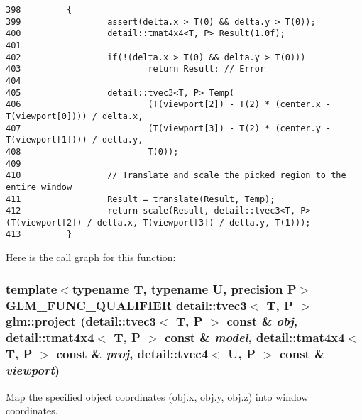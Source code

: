 \begin{Code}\begin{verbatim}398         {
399                 assert(delta.x > T(0) && delta.y > T(0));
400                 detail::tmat4x4<T, P> Result(1.0f);
401 
402                 if(!(delta.x > T(0) && delta.y > T(0)))
403                         return Result; // Error
404 
405                 detail::tvec3<T, P> Temp(
406                         (T(viewport[2]) - T(2) * (center.x - T(viewport[0]))) / delta.x,
407                         (T(viewport[3]) - T(2) * (center.y - T(viewport[1]))) / delta.y,
408                         T(0));
409 
410                 // Translate and scale the picked region to the entire window
411                 Result = translate(Result, Temp);
412                 return scale(Result, detail::tvec3<T, P>(T(viewport[2]) / delta.x, T(viewport[3]) / delta.y, T(1)));
413         }
\end{verbatim}
\end{Code}




Here is the call graph for this function:\hypertarget{group__gtc__matrix__transform_ge6de64f8b0a55befb0e296475c6f0c79}{
\subsubsection[project]{\setlength{\rightskip}{0pt plus 5cm}template$<$typename T, typename U, precision P$>$ GLM\_\-FUNC\_\-QUALIFIER detail::tvec3$<$ T, P $>$ glm::project (detail::tvec3$<$ T, P $>$ const \& {\em obj}, \/  detail::tmat4x4$<$ T, P $>$ const \& {\em model}, \/  detail::tmat4x4$<$ T, P $>$ const \& {\em proj}, \/  detail::tvec4$<$ U, P $>$ const \& {\em viewport})}}
\label{group__gtc__matrix__transform_ge6de64f8b0a55befb0e296475c6f0c79}


Map the specified object coordinates (obj.x, obj.y, obj.z) into window coordinates.

